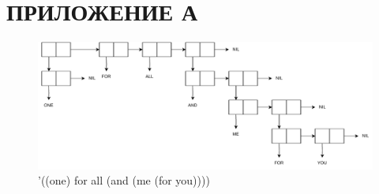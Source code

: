 \documentclass[a4paper,oneside,14pt]{extarticle}
\begin{document}

\newpage
{}\section*{ПРИЛОЖЕНИЕ А}

\begin{figure}[H]
	\centering
    \includegraphics[angle=90, height=0.8\textheight]{img/list3.pdf}
	\caption{'((one) for all (and (me (for you))))}
	\label{fig:3}
\end{figure}
\end{document}
